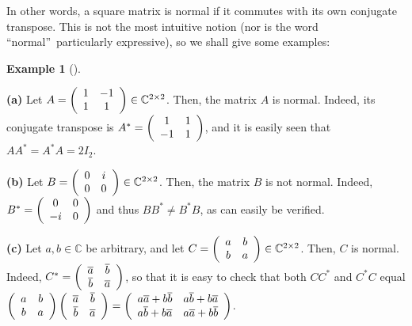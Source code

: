 \documentclass[numbers=enddot,12pt,final,onecolumn,notitlepage]{scrartcl}%
\numberwithin{exer}{subsection}
\theoremstyle{definition}
\newtheorem{exam}[theo]{Example}
\newenvironment{example}[1][]
{\begin{exam}[#1]\begin{leftbar}}
{\end{leftbar}\end{exam}}
\begin{document}
In other words, a square matrix is normal if it commutes with its own
conjugate transpose. This is not the most intuitive notion (nor is the word
\textquotedblleft normal\textquotedblright\ particularly expressive), so we
shall give some examples:

\begin{example}
\textbf{(a)} Let $A=\left(
\begin{array}
[c]{cc}%
1 & -1\\
1 & 1
\end{array}
\right)  \in\mathbb{C}^{2\times2}$. Then, the matrix $A$ is normal. Indeed,
its conjugate transpose is $A^{\ast}=\left(
\begin{array}
[c]{cc}%
1 & 1\\
-1 & 1
\end{array}
\right)  $, and it is easily seen that $AA^{\ast}=A^{\ast}A=2I_{2}$.

\textbf{(b)} Let $B=\left(
\begin{array}
[c]{cc}%
0 & i\\
0 & 0
\end{array}
\right)  \in\mathbb{C}^{2\times2}$. Then, the matrix $B$ is not normal.
Indeed, $B^{\ast}=\left(
\begin{array}
[c]{cc}%
0 & 0\\
-i & 0
\end{array}
\right)  $ and thus $BB^{\ast}\neq B^{\ast}B$, as can easily be verified.

\textbf{(c)} Let $a,b\in\mathbb{C}$ be arbitrary, and let $C=\left(
\begin{array}
[c]{cc}%
a & b\\
b & a
\end{array}
\right)  \in\mathbb{C}^{2\times2}$. Then, $C$ is normal. Indeed, $C^{\ast
}=\left(
\begin{array}
[c]{cc}%
\overline{a} & \overline{b}\\
\overline{b} & \overline{a}%
\end{array}
\right)  $, so that it is easy to check that both $CC^{\ast}$ and $C^{\ast}C$
equal $\left(
\begin{array}
[c]{cc}%
a & b\\
b & a
\end{array}
\right)  \left(
\begin{array}
[c]{cc}%
\overline{a} & \overline{b}\\
\overline{b} & \overline{a}%
\end{array}
\right)  =\left(
\begin{array}
[c]{cc}%
a\overline{a}+b\overline{b} & a\overline{b}+b\overline{a}\\
a\overline{b}+b\overline{a} & a\overline{a}+b\overline{b}%
\end{array}
\right)  $.
\end{example}
\end{document}
